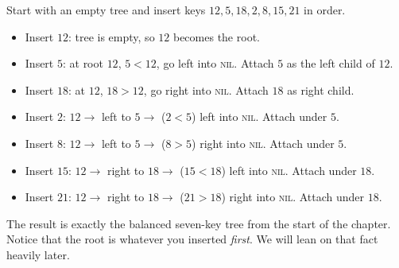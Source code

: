 \begin{example}
\label{ch12:insert-trace}
Start with an empty tree and insert keys $12, 5, 18, 2, 8, 15, 21$ in order.
\begin{itemize}
  \item Insert $12$: tree is empty, so $12$ becomes the root.
  \item Insert $5$: at root $12$, $5 < 12$, go left into \textsc{nil}. Attach $5$ as the left
        child of $12$.
  \item Insert $18$: at $12$, $18 > 12$, go right into \textsc{nil}. Attach $18$ as right child.
  \item Insert $2$: $12 \to$ left to $5 \to$ ($2<5$) left into \textsc{nil}. Attach under $5$.
  \item Insert $8$: $12 \to$ left to $5 \to$ ($8>5$) right into \textsc{nil}. Attach under $5$.
  \item Insert $15$: $12 \to$ right to $18 \to$ ($15<18$) left into \textsc{nil}. Attach under $18$.
  \item Insert $21$: $12 \to$ right to $18 \to$ ($21>18$) right into \textsc{nil}. Attach under $18$.
\end{itemize}
The result is exactly the balanced seven-key tree from the start of the chapter. Notice that
the root is whatever you inserted \emph{first}. We will lean on that fact heavily later.
\end{example}

